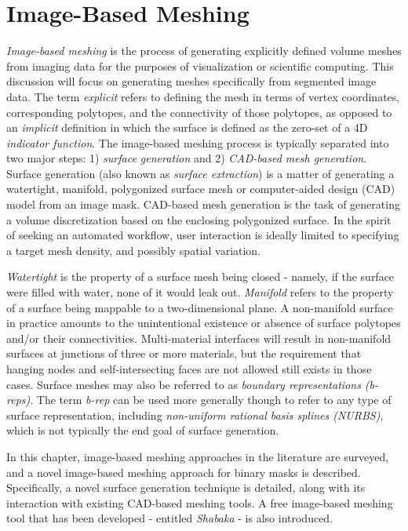 \chapter{Image-Based Meshing}
\label{chap:3}

\textit{Image-based meshing} is the process of generating explicitly defined volume meshes from imaging data for the purposes of visualization or scientific computing. This discussion will focus on generating meshes specifically from segmented image data. The term \textit{explicit} refers to defining the mesh in terms of vertex coordinates, corresponding polytopes, and the connectivity of those polytopes, as opposed to an \textit{implicit} definition in which the surface is defined as the zero-set of a 4D \textit{indicator function}. The image-based meshing process is typically separated into two major steps: 1) \textit{surface generation} and 2) \textit{CAD-based mesh generation}. Surface generation (also known as \textit{surface extraction}) is a matter of generating a watertight, manifold, polygonized surface mesh or computer-aided design (CAD) model from an image mask. CAD-based mesh generation is the task of generating a volume discretization based on the enclosing polygonized surface. In the spirit of seeking an automated workflow, user interaction is ideally limited to specifying a target mesh density, and possibly spatial variation.

\textit{Watertight} is the property of a surface mesh being closed - namely, if the surface were filled with water, none of it would leak out. \textit{Manifold} refers to the property of a surface being mappable to a two-dimensional plane. A non-manifold surface in practice amounts to the unintentional existence or absence of surface polytopes and/or their connectivities. Multi-material interfaces will result in non-manifold surfaces at junctions of three or more materials, but the requirement that hanging nodes and self-intersecting faces are not allowed still exists in those cases. Surface meshes may also be referred to as \textit{boundary representations (b-reps)}. The term \textit{b-rep} can be used more generally though to refer to any type of surface representation, including \textit{non-uniform rational basis splines (NURBS)}, which is not typically the end goal of surface generation. 

In this chapter, image-based meshing approaches in the literature are surveyed, and a novel image-based meshing approach for binary masks is described. Specifically, a novel surface generation technique is detailed, along with its interaction with existing CAD-based meshing tools. A free image-based meshing tool that has been developed - entitled \textit{Shabaka} - is also introduced.

